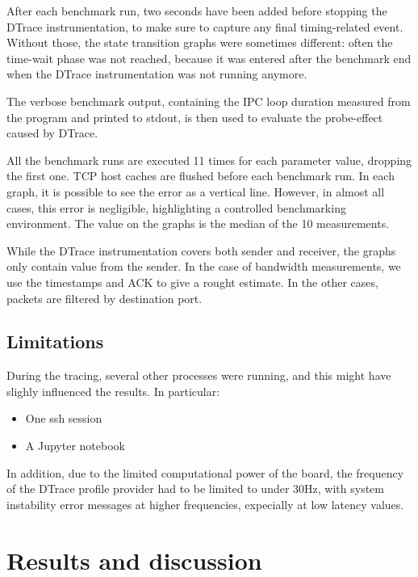 \documentclass[a4paper,10pt]{article}
\begin{document}
After each benchmark run, two seconds have been added before stopping the DTrace instrumentation, to make sure to capture any final timing-related event. Without those, the state transition graphs were sometimes different: often the time-wait phase was not reached, because it was entered after the benchmark end when the DTrace instrumentation was not running anymore.

The verbose benchmark output, containing the IPC loop duration measured from the program and printed to stdout, is then used to evaluate the probe-effect caused by DTrace.


All the benchmark runs are executed 11 times for each parameter value, dropping the first one. TCP host caches are flushed before each benchmark run. In each graph, it is possible to see the error as a vertical line. However, in almost all cases, this error is negligible, highlighting a controlled benchmarking environment. The value on the graphs is the median of the 10 measurements.

While the DTrace instrumentation covers both sender and receiver, the graphs only contain value from the sender. In the case of bandwidth measurements, we use the timestamps and ACK to give a rought estimate. In the other cases, packets are filtered by destination port.

\subsection{Limitations}

During the tracing, several other processes were running, and this might have slighly influenced the results. In particular:
\begin{itemize}
    \item One ssh session
    \item A Jupyter notebook
\end{itemize}

In addition, due to the limited computational power of the board, the frequency of the DTrace profile provider had to be limited to under 30Hz, with system instability error messages at higher frequencies, expecially at low latency values.

\section{Results and discussion}
\end{document}
